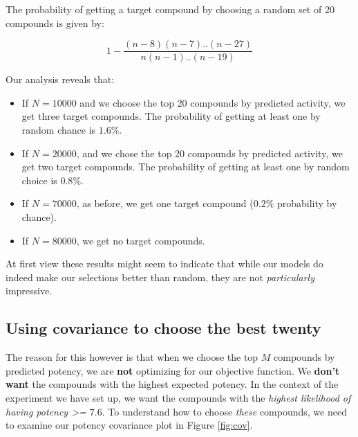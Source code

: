 \documentclass[journal=jacsat,manuscript=article]{achemso}
\begin{document}
The probability of getting a target compound by choosing a random set of 20 compounds is given by:

\begin{equation}
    1-\frac{(n-8)(n-7)..(n-27)}{n(n-1)..(n-19)}
\end{equation}

Our analysis reveals that:
\begin{itemize}
    \item If $N=10000$ and we choose the top 20 compounds by predicted activity, we get three target compounds.  The probability of getting at least one by random chance is $1.6\%$.
    \item If $N=20000$, and we chose the top 20 compounds by predicted activity, we get two target compounds.  The probability of getting at least one by random choice is $0.8\%$.
    \item If $N=70000$, as before, we get one target compound ($0.2\%$ probability by chance).
    \item If $N=80000$, we get no target compounds.
\end{itemize}

At first view these results might seem to indicate that while our models do indeed make our selections better than random, they are not \textit{particularly} impressive.

\subsection*{Using covariance to choose the best twenty}

The reason for this however is that when we choose the top $M$ compounds by predicted potency, we are \textbf{not} optimizing for our objective function.  We \textbf{don't want} the compounds with the highest expected potency.  In the context of the experiment we have set up, we want the compounds with the \textit{highest likelihood of having potency >= $7.6$}.  To understand how to choose \textit{these} compounds, we need to examine our potency covariance plot in Figure \ref{fig:cov}.
\end{document}
